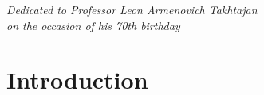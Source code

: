 \documentclass[pdftex]{sigma}%
\numberwithin{equation}{section}
\begin{document}


\begin{flushright}
\begin{minipage}{85mm}
\it Dedicated to Professor Leon Armenovich Takhtajan\\
on the occasion of his 70th birthday
\end{minipage}
\end{flushright}

\renewcommand{\thefootnote}{\arabic{footnote}}
\setcounter{footnote}{0}

\section{Introduction}%
\end{document}

